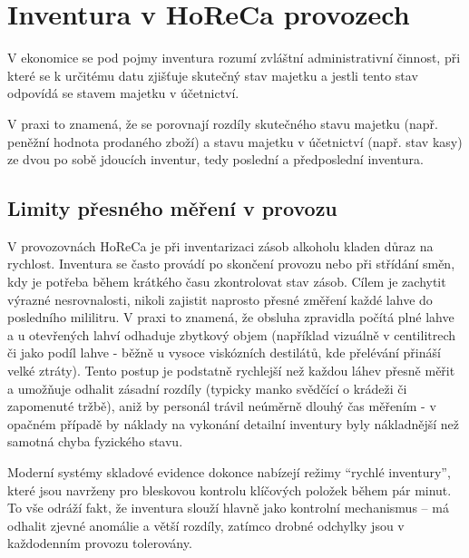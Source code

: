 \chapter{Inventura v HoReCa provozech}
\label{inventura}

V ekonomice se pod pojmy inventura rozumí zvláštní administrativní činnost, při které se k určitému datu zjišťuje skutečný stav majetku a jestli tento stav odpovídá se stavem majetku v účetnictví. 
\cite{Zákon o účetnictví}

V praxi to znamená, že se porovnají rozdíly skutečného stavu majetku (např. peněžní hodnota prodaného zboží) a stavu majetku v účetnictví (např. stav kasy) ze dvou po sobě jdoucích inventur, tedy poslední a předposlední inventura.

\section{Limity přesného měření v provozu}

V provozovnách HoReCa je při inventarizaci zásob alkoholu kladen důraz na rychlost. Inventura se často provádí po skončení provozu nebo při střídání směn, kdy je potřeba během krátkého času zkontrolovat stav zásob. Cílem je zachytit výrazné nesrovnalosti, nikoli zajistit naprosto přesné změření každé lahve do posledního mililitru. V praxi to znamená, že obsluha zpravidla počítá plné lahve a u otevřených lahví odhaduje zbytkový objem (například vizuálně v centilitrech či jako podíl lahve - běžně u vysoce viskózních destilátů, kde přelévání přináší velké ztráty). Tento postup je podstatně rychlejší než každou láhev přesně měřit a umožňuje odhalit zásadní rozdíly (typicky manko svědčící o krádeži či zapomenuté tržbě), aniž by personál trávil neúměrně dlouhý čas měřením - v opačném případě by náklady na vykonání detailní inventury byly nákladnější než samotná chyba fyzického stavu.

Moderní systémy skladové evidence dokonce nabízejí režimy “rychlé inventury”, které jsou navrženy pro bleskovou kontrolu klíčových položek během pár minut. To vše odráží fakt, že inventura slouží hlavně jako kontrolní mechanismus – má odhalit zjevné anomálie a větší rozdíly, zatímco drobné odchylky jsou v každodenním provozu tolerovány.
	
